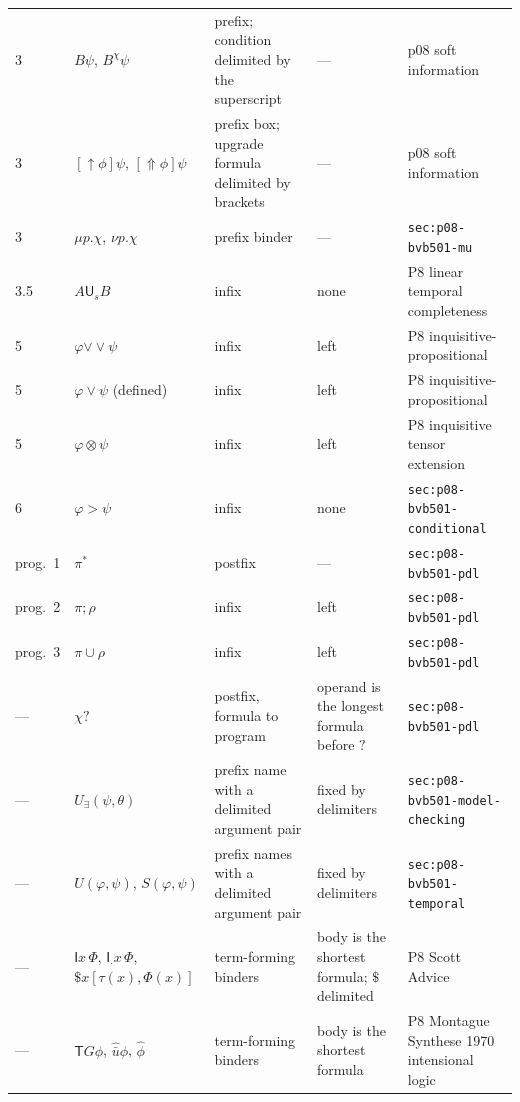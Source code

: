 \begin{longtable}{@{}p{}p{}p{}p{}p{}@{}}
3 & \(B\psi\), \(B^\chi\psi\) & prefix; condition delimited by the superscript & --- & p08 soft information \\
3 & \([\uparrow\phi]\psi\), \([\Uparrow\phi]\psi\) & prefix box; upgrade formula delimited by brackets & --- & p08 soft information \\
3 & \(\mu p.\chi\), \(\nu p.\chi\) & prefix binder & --- & \texttt{sec:\allowbreak{}p08-\allowbreak{}bvb501-\allowbreak{}mu} \\
3.5 & \(A\mathbin{\mathsf U_s}B\) & infix & none & P8 linear temporal completeness \\
5 & \(\varphi\mathbin{\vee\!\vee}\psi\) & infix & left & P8 inquisitive-propositional \\
5 & \(\varphi\lor\psi\) (defined) & infix & left & P8 inquisitive-propositional \\
5 & \(\varphi\otimes\psi\) & infix & left & P8 inquisitive tensor extension \\
6 & \(\varphi>\psi\) & infix & none & \texttt{sec:\allowbreak{}p08-\allowbreak{}bvb501-\allowbreak{}conditional} \\
prog.~1 & \(\pi^*\) & postfix & --- & \texttt{sec:\allowbreak{}p08-\allowbreak{}bvb501-\allowbreak{}pdl} \\
prog.~2 & \(\pi;\rho\) & infix & left & \texttt{sec:\allowbreak{}p08-\allowbreak{}bvb501-\allowbreak{}pdl} \\
prog.~3 & \(\pi\cup\rho\) & infix & left & \texttt{sec:\allowbreak{}p08-\allowbreak{}bvb501-\allowbreak{}pdl} \\
--- & \(\chi?\) & postfix, formula to program & operand is the longest formula before \(?\) & \texttt{sec:\allowbreak{}p08-\allowbreak{}bvb501-\allowbreak{}pdl} \\
--- & \(U_{\exists}(\psi,\theta)\) & prefix name with a delimited argument pair & fixed by delimiters & \texttt{sec:\allowbreak{}p08-\allowbreak{}bvb501-\allowbreak{}model-\allowbreak{}checking} \\
--- & \(U(\varphi,\psi)\), \(S(\varphi,\psi)\) & prefix names with a delimited argument pair & fixed by delimiters & \texttt{sec:\allowbreak{}p08-\allowbreak{}bvb501-\allowbreak{}temporal} \\
--- & \(\mathsf I x\,\Phi\), \(\mathsf I_{\cdot}x\,\Phi\), \(\$x[\tau(x),\Phi(x)]\) & term-forming binders & body is the shortest formula; \(\$\) delimited & P8 Scott Advice \\
--- & \(\mathsf T G\phi\), \(\widehat{\bar u}\phi\), \(\widehat\phi\) & term-forming binders & body is the shortest formula & P8 Montague Synthese 1970 intensional logic \\
\end{longtable}
\endgroup

